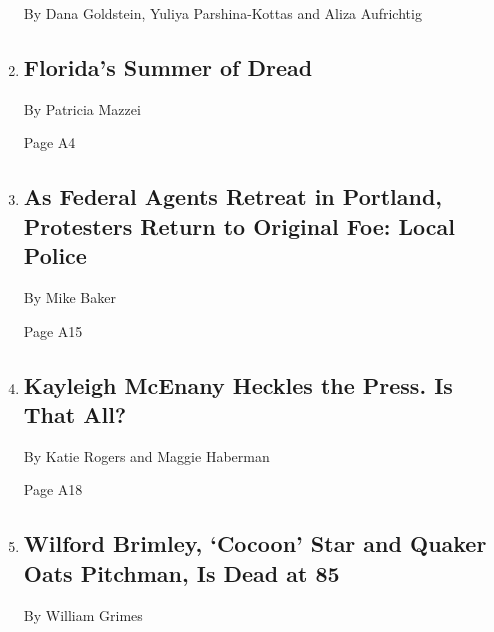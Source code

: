 \begin{enumerate}
  By Dana Goldstein, Yuliya Parshina-Kottas and Aliza Aufrichtig
\item
  \href{/2020/08/02/us/florida-hurricane-isaias-coronavirus.html}{}

  \hypertarget{floridas-summer-of-dread}{%
  \subsection{Florida's Summer of
  Dread}\label{floridas-summer-of-dread}}

  By Patricia Mazzei

  Page A4
\item
  \href{/2020/08/02/us/portland-protests-.html}{}

  \hypertarget{as-federal-agents-retreat-in-portland-protesters-return-to-original-foe-local-police}{%
  \subsection{As Federal Agents Retreat in Portland, Protesters Return
  to Original Foe: Local
  Police}\label{as-federal-agents-retreat-in-portland-protesters-return-to-original-foe-local-police}}

  By Mike Baker

  Page A15
\item
  \href{/2020/08/02/us/politics/kayleigh-mcenany.html}{}

  \hypertarget{kayleigh-mcenany-heckles-the-press-is-that-all}{%
  \subsection{Kayleigh McEnany Heckles the Press. Is That
  All?}\label{kayleigh-mcenany-heckles-the-press-is-that-all}}

  By Katie Rogers and Maggie Haberman

  Page A18
\item
  \href{/2020/08/01/obituaries/wilford-brimley-dead.html}{}

  \hypertarget{wilford-brimley-cocoon-star-and-quaker-oats-pitchman-is-dead-at-85}{%
  \subsection{Wilford Brimley, `Cocoon' Star and Quaker Oats Pitchman,
  Is Dead at
  85}\label{wilford-brimley-cocoon-star-and-quaker-oats-pitchman-is-dead-at-85}}

  By William Grimes


\end{enumerate}
